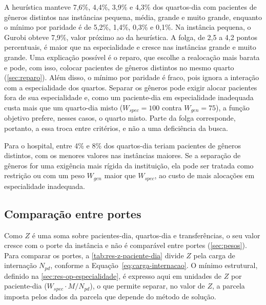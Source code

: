 A heurística manteve 7,6\%, 4,4\%, 3,9\% e 4,3\% dos quartos-dia com pacientes de gêneros distintos nas instâncias pequena, média, grande e muito grande, enquanto o mínimo por paridade é de 5,2\%, 1,4\%, 0,3\% e 0,1\%. Na instância pequena, o Gurobi obteve 7,9\%, valor próximo ao da heurística. A folga, de 2,5 a 4,2 pontos percentuais, é maior que na especialidade e cresce nas instâncias grande e muito grande. Uma explicação possível é o reparo, que escolhe a realocação mais barata e pode, com isso, colocar pacientes de gêneros distintos no mesmo quarto (\autoref{sec:reparo}). Além disso, o mínimo por paridade é fraco, pois ignora a interação com a especialidade dos quartos. Separar os gêneros pode exigir alocar pacientes fora de sua especialidade e, como um paciente-dia em especialidade inadequada custa mais que um quarto-dia misto ($W_{spec} = 100$ contra $W_{gen} = 75$), a função objetivo prefere, nesses casos, o quarto misto. Parte da folga corresponde, portanto, a essa troca entre critérios, e não a uma deficiência da busca.

Para o hospital, entre 4\% e 8\% dos quartos-dia teriam pacientes de gêneros distintos, com os menores valores nas instâncias maiores. Se a separação de gêneros for uma exigência mais rígida da instituição, ela pode ser tratada como restrição ou com um peso $W_{gen}$ maior que $W_{spec}$, ao custo de mais alocações em especialidade inadequada.

\subsection{Comparação entre portes}
\label{sec:res-entre-portes}

Como $Z$ é uma soma sobre pacientes-dia, quartos-dia e transferências, o seu valor cresce com o porte da instância e não é comparável entre portes (\autoref{sec:pesos}). Para comparar os portes, a \autoref{tab:res-z-paciente-dia} divide $Z$ pela carga de internação $N_{pd}$, conforme a Equação~\eqref{eq:carga-internacao}. O mínimo estrutural, definido na \autoref{sec:res-op-especialidade}, é expresso aqui em unidades de $Z$ por paciente-dia ($W_{spec} \cdot M/N_{pd}$), o que permite separar, no valor de $Z$, a parcela imposta pelos dados da parcela que depende do método de solução.

